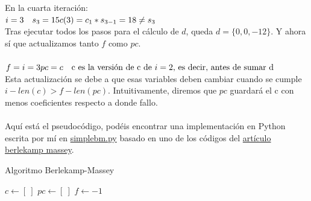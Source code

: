 \\\\
En la cuarta iteración: \\
\(i=3 \quad s_3 = 15 \\
c(3) = c_1 * s_{3-1} = 18 \neq s_3\\
\)\\
Tras ejecutar todos los pasos para el cálculo de $d$, queda $d = \{ 0, 0, -12\}$. Y ahora sí que actualizamos tanto $f$ como $pc$.\\\\
\(f = i = 3 \\
pc = c \quad \text{c es la versión de c de $i=2$, es decir, antes de sumar d}\\
\)\\
Esta actualización se debe a que esas variables deben cambiar cuando se cumple $i - len(c) > f - len(pc)$. Intuitivamente, diremos que $pc$ guardará el c con menos coeficientes respecto a donde fallo. \\\\%
Aquí está el pseudocódigo, podéis encontrar una implementación en Python escrita por mí en \href{https://github.com/domingoUnican/TFGPedroCastro/blob/main/code/code_proofs/simple_berlekamp_massey.py}{simplebm.py} basado en uno de los códigos del \href{https://mzhang2021.github.io/cp-blog/berlekamp-massey/}{artículo berlekamp massey}.
\begin{algorithm}
\caption{Algoritmo Berlekamp-Massey}\label{alg:two}
$c \gets [ \ ]$\;
$pc \gets [ \ ]$\;
$f \gets -1$\;
\end{algorithm}

\newpage
